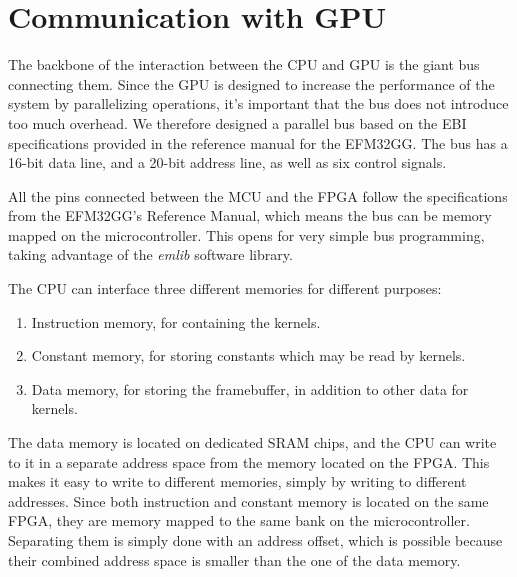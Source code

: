 \documentclass[../main/report.tex]{subfiles}
\begin{document}
\section{Communication with GPU}

The backbone of the interaction between the CPU and GPU is the giant bus connecting them.
Since the GPU is designed to increase the performance of the system by parallelizing operations,
it's important that the bus does not introduce too much overhead.
We therefore designed a parallel bus based on the EBI specifications provided
in the reference manual for the EFM32GG\cite[p.175]{efm32gg}.
The bus has a 16-bit data line, and a 20-bit address line, as well as six control signals.

All the pins connected between the MCU and the FPGA follow the specifications from the EFM32GG's Reference Manual\cite[p.175]{efm32gg},
which means the bus can be memory mapped on the microcontroller.
This opens for very simple bus programming, taking advantage of the \textit{emlib} software library.

The CPU can interface three different memories for different purposes:

\begin{enumerate}
    \item Instruction memory, for containing the kernels.
    \item Constant memory, for storing constants which may be read by kernels.
    \item Data memory, for storing the framebuffer, in addition to other data for kernels.
\end{enumerate}

The data memory is located on dedicated SRAM chips,
and the CPU can write to it in a separate address space from the memory located on the FPGA.
This makes it easy to write to different memories, simply by writing to different addresses.
Since both instruction and constant memory is located on the same FPGA,
they are memory mapped to the same bank on the microcontroller.
Separating them is simply done with an address offset,
which is possible because their combined address space is smaller than the one of the data memory.
\end{document}
